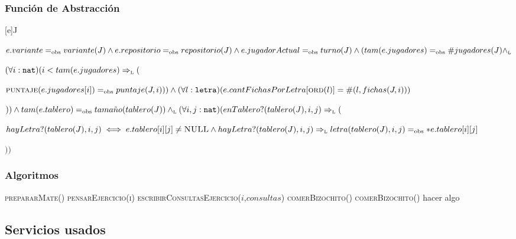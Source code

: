 \par\vspace*{3ex}%

\subsubsection*{Función de Abstracción}
[e]{J}{$
  e.variante=_{\mathrm{obs}} variante(J)\land\\
  e.repositorio=_{\mathrm{obs}} repositorio(J)\land\\
  e.jugadorActual=_{\mathrm{obs}} turno(J)\land\\
  (tam(e.jugadores)=_{\mathrm{obs}} \#jugadores(J)\land_{\mathrm{\scriptscriptstyle{L}}}$
  \begin{adjustwidth}{11.4em}{0em}
  $(\forall i:\texttt{nat})(i<tam(e.jugadores)\Rightarrow_{\mathrm{\scriptscriptstyle{L}}}($
  \begin{adjustwidth}{2em}{0em}
    $
    \textsc{puntaje}(e.jugadores[i])=_{\mathrm{obs}} puntaje(J,i)))\land\\
    (\forall l:\texttt{letra})(e.cantFichasPorLetra[\textsc{ord}(l)]=\#(l,fichas(J,i)))
    $
  \end{adjustwidth}$))\land\\
  tam(e.tablero)=_{\mathrm{obs}} tama\tilde{n}o(tablero(J))\land_{\mathrm{\scriptscriptstyle{L}}}\\
  (\forall i,j:\texttt{nat})(enTablero?(tablero(J),i,j)\Rightarrow_{\mathrm{\scriptscriptstyle{L}}}($
  \begin{adjustwidth}{2em}{0em}
    $
      hayLetra?(tablero(J),i,j)\iff e.tablero[i][j]\neq\textsc{NULL}\land\\
      hayLetra?(tablero(J),i,j)\Rightarrow_{\mathrm{\scriptscriptstyle{L}}} letra(tablero(J),i,j)=_{\mathrm{obs}} *e.tablero[i][j]
    $
  \end{adjustwidth}$))$
  \end{adjustwidth}
}

\subsubsection*{Algoritmos}
\begin{algorithm}[H]
  \begin{algorithmic}[1]
    \State{} 
    \State{} 
    \State{}
    \State\textsc{prepararMate()} 
    \State\textsc{pensarEjercicio(i)}
      \State\textsc{escribirConsultasEjercicio($i$,$consultas$)}
    \Else
      \State\textsc{comerBizochito()}
    \EndIf
      \State\textsc{comerBizochito()}
    \EndWhile
         \State hacer algo
    \EndFor
    \State{}
  \end{algorithmic}
\end{algorithm}

\subsection{Servicios usados}
\newpage

